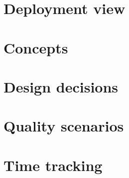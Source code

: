 \documentclass[11pt, oneside]{book}
\begin{document}
\chapter{Deployment view}
\label{chp:deployment}


\chapter{Concepts}
\label{chp:concepts}


\chapter{Design decisions}
\label{chp:design_decisions}


\chapter{Quality scenarios}
\label{chp:quality_scenarios}


\listoftodos[Notes]

\appendix

\chapter{Time tracking}
\label{chp:time_track}


\backmatter

\printbibliography
\end{document}
